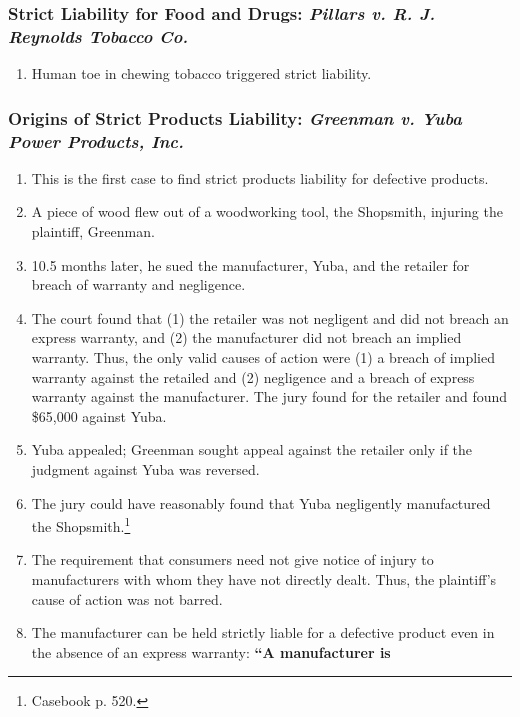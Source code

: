 \subsubsection{Strict Liability for Food and Drugs: \emph{Pillars v. R. J. 
Reynolds Tobacco Co.}}

\begin{enumerate}
    \item Human toe in chewing tobacco triggered strict liability.
\end{enumerate}

\subsubsection{Origins of Strict Products Liability: \emph{Greenman v. Yuba 
Power Products, Inc.}}

\begin{enumerate}
    \item This is the first case to find strict products liability for defective 
    products.
    \item A piece of wood flew out of a woodworking tool, the Shopsmith, 
    injuring the plaintiff, Greenman.
    \item 10.5 months later, he sued the manufacturer, Yuba, and the retailer 
    for breach of warranty and negligence.
    \item The court found that (1) the retailer was not negligent and did not 
    breach an express warranty, and (2) the manufacturer did not breach an 
    implied warranty. Thus, the only valid causes of action were (1) a breach of 
    implied warranty against the retailed and (2) negligence and a breach of 
    express warranty against the manufacturer. The jury found for the retailer 
    and found \$65,000 against Yuba.
    \item Yuba appealed; Greenman sought appeal against the retailer only if the 
    judgment against Yuba was reversed.
    \item The jury could have reasonably found that Yuba negligently 
    manufactured the Shopsmith.\footnote{Casebook p. 520.}
    \item The requirement that consumers need not give notice of injury to 
    manufacturers with whom they have not directly dealt. Thus, the plaintiff's 
    cause of action was not barred.
    \item The manufacturer can be held strictly liable for a defective product 
    even in the absence of an express warranty: \textbf{``A manufacturer is 
}
\end{enumerate}
